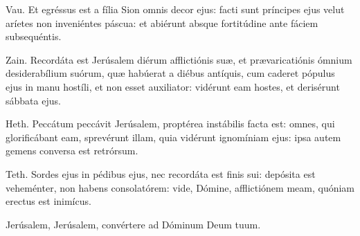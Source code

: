 
Vau. Et egréssus est a fília Sion omnis decor ejus: facti sunt príncipes ejus velut aríetes non inveniéntes páscua: et abiérunt absque fortitúdine ante fáciem subsequéntis.

Zain. Recordáta est Jerúsalem diérum afflictiónis suæ, et prævaricatiónis ómnium desiderabílium suórum, quæ habúerat a diébus antíquis, cum caderet pópulus ejus in manu hostíli, et non esset auxiliator: vidérunt eam hostes, et derisérunt sábbata ejus.

Heth. Peccátum peccávit Jerúsalem, proptérea instábilis facta est: omnes, qui glorificábant eam, sprevérunt illam, quia vidérunt ignomíniam ejus: ipsa autem gemens conversa est retrórsum.

Teth. Sordes ejus in pédibus ejus, nec recordáta est finis sui: depósita est veheménter, non habens consolatórem: vide, Dómine, afflictiónem meam, quóniam erectus est inimícus.

Jerúsalem, Jerúsalem, convértere ad Dóminum Deum tuum.
\par